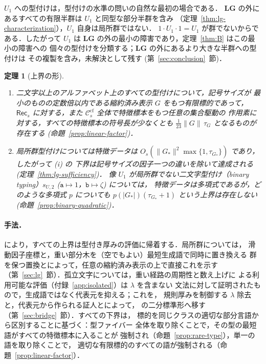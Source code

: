 \documentclass[11pt,a4paper]{ltjsarticle}
\numberwithin{equation}{section}
\theoremstyle{plain}
\theoremstyle{definition}
\theoremstyle{remark}
\theoremstyle{plain}
\newtheorem{mainthm}{定理}
\newcommand{\cf}{\mathrm{cf}}
\newcommand{\Ccf}[1]{\mathcal C_{#1}^{\cf}}
\newcommand{\Rec}{\mathsf{Rec}}
\newcommand{\LG}{\mathbf{LG}}
\begin{document}
$U_1$ への型付けは，型付けの水準の問いの自然な最初の場合である．
$\LG$ の外にあるすべての有限半群は $U_1$ と同型な部分半群を含み
（定理~\ref{thm:lg-characterization}），$U_1$ 自身は局所群ではない．
$1\cdot U_1\cdot1=U_1$ が群でないからである．したがって $U_1$ は
$\LG$ の外の最小の障害であり，定理~\ref{thm:B} はこの最小の障害への
個々の型付けを分類する；$\LG$ の外にあるより大きな半群への型付けは
その複製を含み，未解決として残す
\textup(第~\ref{sec:conclusion}~節\textup)．

\begin{mainthm}[上界の形]
\label{thm:C}
\begin{enumerate}[label=\textup{(\roman*)},leftmargin=*]
\item 二文字以上のアルファベット上のすべての型付けについて，記号サイズが
最小のものの定数倍以内である縮約済み表示 $G$ をもつ有限標的であって，
$\Rec_s$ に対する，また $\Ccf{s}$ 全体で特徴標本をもつ任意の集合駆動の
作用素に対する，すべての特徴標本の符号長が少なくとも
$\tfrac1{23}\|G\|\,\tau_G$ となるものが存在する
\textup(命題~\ref{prop:linear-factor}\textup)．
\item 局所群型付けについては特徴データは
$O_s(\|G_*\|^2\max\{1,\tau_{G_*}\})$ であり，したがって \textup{(i)} の
下界は記号サイズの因子一つの違いを除いて達成される
\textup(定理~\ref{thm:lg-sufficiency}\textup)．
像 $U_1$ が局所群でない二文字型付け（binary typing）$s_{U,2}$
\textup($\mathtt a\mapsto1$，$\mathtt b\mapsto\zeta$\textup) については，
特徴データは多項式であるが，どのような多項式 $p$ についても
$p(|G_*|)(\tau_{G_*}+1)$ という上界は存在しない
\textup(命題~\ref{prop:binary-quadratic}\textup)．
\end{enumerate}
\end{mainthm}

\paragraph{手法．}
\cite[系~6.3]{kuriyamaCFG} により，すべての上界は型付き厚みの評価に帰着する．局所群については，
滑動因子座標と，重い部分木を（空でもよい）最短生成語で同時に置き換える
群を保つ置換とによって，任意の縮約済み表示の上で直接これを示す
（第~\ref{sec:lg}~節）．孤立文字については，重い経路の周期性と数え上げに
よる利用可能な評価（付録~\ref{app:isolated}）は $\lambda$ を含まない
文法に対して証明されたもので，生成語ではなく代表元を抑える；これを，
規則厚みを制御する $\lambda$ 除去と，代表元から作られる証人とによって，
\cite{kuriyamaCFG} の二分標準形へ移す（第~\ref{sec:bridge}~節）．すべての下界は，
標的を同じクラスの適切な部分言語から区別することに基づく：型ファイバー
全体を取り除くことで，その型の最短語がすべての特徴標本に入ることが
強制され（命題~\ref{prop:rare-type}），単一の語を取り除くことで，
適切な有限標的のすべての語が強制される（命題~\ref{prop:linear-factor}）．
\end{document}
